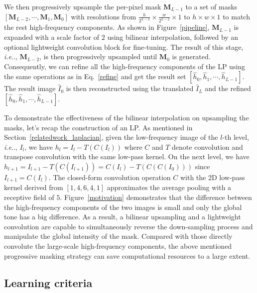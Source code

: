 \documentclass[10pt,twocolumn,letterpaper]{article}
\makeatletter
\DeclareRobustCommand\onedot{\futurelet\@let@token\@onedot}
\def\@onedot{\ifx\@let@token.\else.\null\fi\xspace}
\def\ie{\emph{i.e}\onedot} \def\Ie{\emph{I.e}\onedot}
\makeatother
\begin{document}
	We then progressively upsample the per-pixel mask $\bm{M}_{L-1}$ to a set of masks $[\bm{M}_{L-2}, \cdots, \bm{M}_1, \bm{M}_0]$ with resolutions from $\frac{h}{2^{L-2}}\times \frac{w}{2^{L-2}}\times 1$ to $h\times w\times 1$ to match the rest high-frequency components. As shown in Figure~\ref{pipeline}, $\bm{M}_{L-1}$ is expanded with a scale factor of $2$ using bilinear interpolation, followed by an optional lightweight convolution block for fine-tuning. The result of this stage, \ie, $\bm{M}_{L-2}$, is then progressively upsampled until $ \bm{M}_0 $ is generated. Consequently, we can refine all the high-frequency components of the LP using the same operations as in Eq.~\eqref{refine} and get the result set $[\hat{h}_0, \hat{h}_1, \cdots, \hat{h}_{L-1}]$. The result image $ \hat{I}_0 $ is then reconstructed using the translated $\hat{I}_L$ and the refined $[\hat{h}_0, \hat{h}_1, \cdots, \hat{h}_{L-1}]$.
	
	To demonstrate the effectiveness of the bilinear interpolation on upsampling the masks, let's recap the construction of an LP. As mentioned in Section~\ref{relatedwork_laplacian}, given the low-frequency image of the $l$-th level, \ie, $I_l$, we have $h_l = I_l - T(C(I_l))$ where $C$ and $T$ denote convolution and transpose convolution with the same low-pass kernel. On the next level, we have $h_{l+1} = I_{l+1} - T(C(I_{l+1})) = C(I_l) - T(C(C(I_0)))$ since $I_{l+1} = C(I_l)$. The closed-form convolution operation $C$ with the 2D low-pass kernel derived from $[1, 4, 6, 4, 1]$ approximates the average pooling with a receptive field of $5$. Figure~\ref{motivation} demonstrates that the difference between the high-frequency components of the two images is small and only the global tone has a big difference. As a result, a bilinear upsampling and a lightweight convolution are capable to simultaneously reverse the down-sampling process and manipulate the global intensity of the mask. Compared with those directly convolute the large-scale high-frequency components, the above mentioned progressive masking strategy can save computational resources to a large extent.
	
	\subsection{Learning criteria}
	
\end{document}
